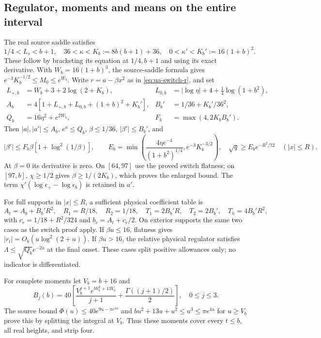 \subsection{Regulator, moments and means on the entire interval}
The real source saddle satisfies
\[
 1/4<L_s<b+1,\quad36<\kappa<K_b:=8b(b+1)+36,
 \quad0<\kappa'<K_b':=16(1+b)^2.
\]
These follow by bracketing its equation at $1/4,b+1$ and using its
exact derivative. With $W_b=16(1+b)^3$, the source-saddle formula gives
$e^{-3}K_b^{-1/2}\le M_0\le e^{W_b}$.
Write $r=a-\beta x^2$ as in \eqref{eq:ua-switch-r}, and set
\begin{align*}
 L_{+,b}&=W_b+3+2\log(2+K_b),&
 L_{0,b}&=|\log\eta|+4+\tfrac14\log(1+b^2),\\
 A_b&=4[1+L_{+,b}+L_{0,b}+(1+b)^2+K_b'],&
 B_b'&=1/36+K_b'/36^2,\\
 Q_b&=16\eta^2+e^{2W_b},&
 F_b&=\max(4,2K_bB_b').
\end{align*}
Then $|a|,|a'|\le A_b$, $e^a\le Q_b$, $\beta\le1/36$,
$|\beta'|\le B_b'$, and
\begin{equation}
 |\beta'|\le F_b\beta[1+\log^2(1/\beta)],\qquad
 E_b=\min\left(\frac{4\eta e^{-4}}{(1+b^2)^{1/4}},
                    e^{-3}K_b^{-3/2}\right),\quad
 \sqrt q\ge E_be^{-R^2/72}\quad(|x|\le R).
 \label{eq:at-regulator}
\end{equation}
At $\beta=0$ its derivative is zero. On $[64,97]$ use the proved switch
flatness; on $[97,b]$, $\chi\ge1/2$ gives $\beta\ge1/(2K_b)$,
which proves the enlarged bound. The term
$\chi'(\log\epsilon_+-\log\epsilon_b)$ is retained in $a'$.

For full supports in $|x|\le R$, a sufficient physical coefficient
table is
\[
 A_t=A_b+B_b'R^2,\quad R_1=R/18,\quad R_2=1/18,\quad
 T_1=2B_b'R,\quad T_2=2B_b',\quad T_h=4B_b'R^2,
\]
with $c_r=1/18+R^2/324$ and $b_r=A_t+c_r/2$.
On exterior supports the same two cases as the switch proof apply.
If $\beta u\le16$, flatness gives $|r_t|=O_b(u\log^2(2+u))$.
If $\beta u>16$, the relative physical regulator satisfies
$\Lambda\le\sqrt{Q_b}e^{-2u}$ at the final onset. These cases split
positive allowances only; no indicator is differentiated.

For complete moments let $V_b=b+16$ and
\begin{equation}
 B_j(b)=40\left[\frac{V_b^{j+1}e^{bV_b^2+13V_b}}{j+1}
                     +\frac{\Gamma((j+1)/2)}2\right],\quad 0\le j\le3.
 \label{eq:at-moments}
\end{equation}
The source bound $\Phi(u)\le40e^{9u-\pi e^{4u}}$ and
$bu^2+13u+u^2\le u^3\le\pi e^{4u}$ for $u\ge V_b$ prove this
by splitting the integral at $V_b$. Thus these moments cover every
$t\le b$, all real heights, and strip four.

